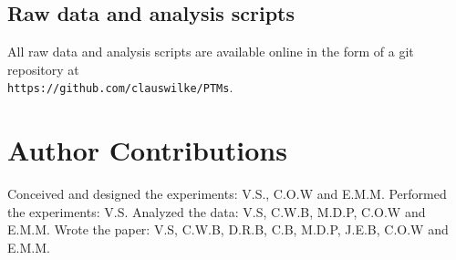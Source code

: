 \documentclass[12pt]{article}
\begin{document}






\subsection{Raw data and analysis scripts}

All raw data and analysis scripts are available online in the form of a git repository at\\ \texttt{https://github.com/clauswilke/PTMs}.


\section{Author Contributions}
Conceived and designed the experiments: V.S., C.O.W and E.M.M. Performed the experiments: V.S. Analyzed the data: V.S, C.W.B, M.D.P, C.O.W and E.M.M. Wrote the paper: V.S, C.W.B, D.R.B, C.B, M.D.P, J.E.B, C.O.W and E.M.M.
\end{document}
